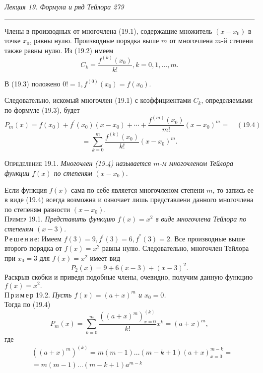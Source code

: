 \documentclass[12pt]{book}
\begin{document}
\small{\slshape{ \noindent Лекция 19. Формула и ряд Тейлора     \hfill 279} \upshape} \normalsize
\hrule\bigskip
Члены в производных от многочлена (19.1), содержащие множитель $(x-x_{0})$ в точке $x_{0}$, равны нулю. Производные порядка выше $m$ от многочлена $m$-й степени также равны нулю. Из (19.2) имеем 
\begin{equation} \tag{19.3}
 C_{k}=\frac{f^{(k)}(x_{0})}{k!},k=0,1,\dots,m.
\end{equation}

В (19.3) положено $0!=1, f^{(0)}(x_{0})=f(x_{0}).$ 

Следовательно, искомый многочлен (19.1) с коэффициентами $C_{k}$, определяемыми по формуле (19.3), будет
$$P_{m}(x)=f(x_{0})+f^{'}(x_{0})(x-x_{0})+  \cdots + \frac{f^{(m)}(x_{0})}{m!}(x-x_{0})^{m}= \quad (19.4)$$
$$=\sum\limits_{k=0}^{m}\frac{f^{(k)}(x_{0})}{k!}(x-x_{0})^{m}.$$

\textsc{Определение} 19.1.\textit{ Многочлен (19.4) называется $m$-м многочленом Тейлора функции $f(x)$ по степеням} $(x-x_{0}).$

Если функция $f(x)$ сама по себе является многочленом степени $m$, то запись ее в виде (19.4) всегда возможна и озночает лишь представлени данного многочлена по степеням разности $(x-x_{0})$.\\

\textsc{Пример} 19.1.\textit{ Представить функцию $f(x)=x^{2}$ в виде многочлена Тейлора по степеням $(x-3)$.} \\

Р\,е\,ш\,е\,н\,и\,е: Имеем $f(3)=9, f^{'}(3)=6, f^{''}(3)=2.$ Все производные выше второго порядка от $f(x)=x^{2}$ равны нулю. Следовательно, многочлен Тейлора при $x_{0}=3$ для $f(x)=x^2$ имеет вид
$$P_{2}(x)=9+6(x-3)+(x-3)^{2}.$$
Раскрыв скобки и приведя подобные члены, очевидно, получим данную функцию $f(x)=x^{2}.$ \\

П\,р\,и\,м\,е\,р 19.2.\textit{ Пусть $f(x)=(a+x)^{m}$ и $x_{0}=0$.} \\

Тогда по (19.4) 
$$P_{m}(x)=\sum\limits_{k=0}^{m} \frac{((a+x)^{m})_{x=0}^{(k)}}{k!}x^{k}=(a+x)^{m},$$
где
\begin{equation*} \begin{split}
&((a+x)^{m})^{(k)}=m(m-1)...(m-k+1)(a+x)_{x=0}^{m-k}= \\
&=m(m-1)...(m-k+1)a^{m-k}
\end{split}
\end{equation*}
\end{document}
